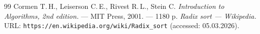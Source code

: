 \begin{thebibliography}{99}
Cormen T.\,H., Leiserson C.\,E., Rivest R.\,L., Stein C.
{\itshape Introduction to Algorithms, 2nd edition.} --- MIT Press, 2001. --- 1180 p.
{\itshape Radix sort --- Wikipedia.} \\URL: \texttt{https://en.wikipedia.org/wiki/Radix\_sort} (accessed: 05.03.2026).
\end{thebibliography}
\pagebreak
